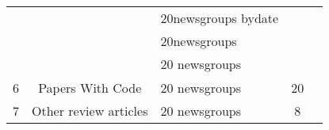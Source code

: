 \documentclass{article}
\begin{document}
\begin{landscape}
\begin{table}[]
{\begin{tabular}{cclcccccc}
          &       & 20newsgroups bydate & \multicolumn{3}{c}{}  & \multicolumn{3}{c}{} \\
          &       & 20newsgroups & \multicolumn{3}{c}{}  & \multicolumn{3}{c}{} \\
          &       & 20 newsgroups & \multicolumn{3}{c}{}  & \multicolumn{3}{c}{} \\
    \multirow{5}[0]{*}{6} & \multirow{5}[0]{*}{Papers With Code} & \multirow{5}[0]{*}{20 newsgroups} & \multicolumn{3}{c}{\multirow{5}[0]{*}{20}} & \multicolumn{3}{c}{} \\
          &       &       & \multicolumn{3}{c}{}  & \multicolumn{3}{c}{} \\
          &       &       & \multicolumn{3}{c}{}  & \multicolumn{3}{c}{} \\
          &       &       & \multicolumn{3}{c}{}  & \multicolumn{3}{c}{} \\
          &       &       & \multicolumn{3}{c}{}  & \multicolumn{3}{c}{} \\
    7     & Other review articles & 20 newsgroups  & \multicolumn{3}{c}{8} & \multicolumn{3}{c}{} \\
     \hline
    \end{tabular}%
}
  \label{tab:addlabel}%
\end{table}%
\end{landscape}
\end{document}
